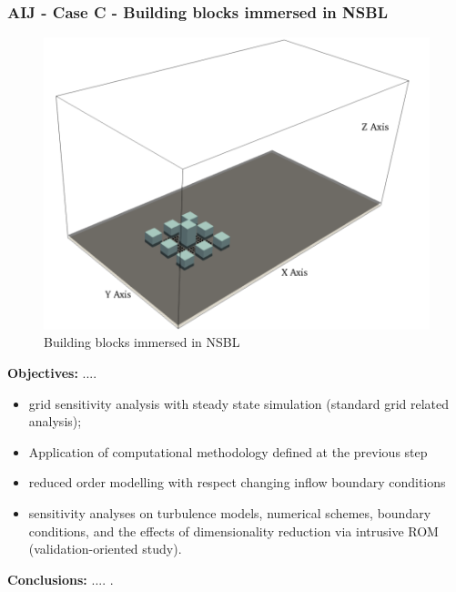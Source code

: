 \subsubsection{AIJ - Case C - Building blocks immersed in NSBL}
    \begin{figure}[h!]
        \centering
        \hypertarget{link:aij_C}{}
        \includegraphics[scale=0.7]{imgs/aij_C.png}
        \caption{Building blocks immersed in NSBL}
    \end{figure}
    \textbf{Objectives:} ....
    \begin{itemize}
        \item grid sensitivity analysis with steady state simulation (standard grid related analysis);
        \item Application of computational methodology defined at the previous step
        \item reduced order modelling with respect changing inflow boundary conditions
        \item sensitivity analyses on turbulence models, numerical schemes, boundary conditions, and the effects of dimensionality reduction via intrusive ROM (validation-oriented study).
    \end{itemize}
    \textbf{Conclusions:} .... .\newline
